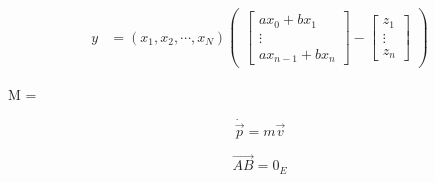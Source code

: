 \begin{align}
  y &= (x_{1},x_{2},\cdots, x_{N})
      \begin{pmatrix}
        \begin{bmatrix}
         ax_{0} + bx_{1} \\
         \vdots \\
         ax_{n-1}+bx_{n}
        \end{bmatrix} -
        \begin{bmatrix}
         z_{1} \\
         \vdots \\
         z_{n}
       \end{bmatrix}
  \end{pmatrix}
\end{align}


M = 




$$\dot{\vec{p}} = m\vec{v}$$



$$\overrightarrow{AB} = 0_E$$
